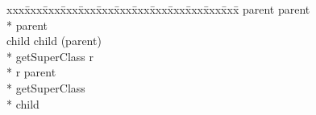 {\small\it\begin{minipage}{\textwidth}\begin{tabbing}
xxx\=xxx\=xxx\=xxx\=xxx\=xxx\=xxx\=xxx\=xxx\=xxx\=xxx\=xxx\=xxx\=\+\kill%
 parent \assign{}  parent \\*{}%
 parent\\[1.0ex]{}%
 child \assign{}  child (parent)\+\\*{}%
     getSuperClass \returns{} \/\LB{}r \CO{} \/\RB{}\+\\*{}%
    r \assign{} parent\-\\*{}%
   getSuperClass\-\\*{}%
 child
\end{tabbing}\end{minipage}}
  

